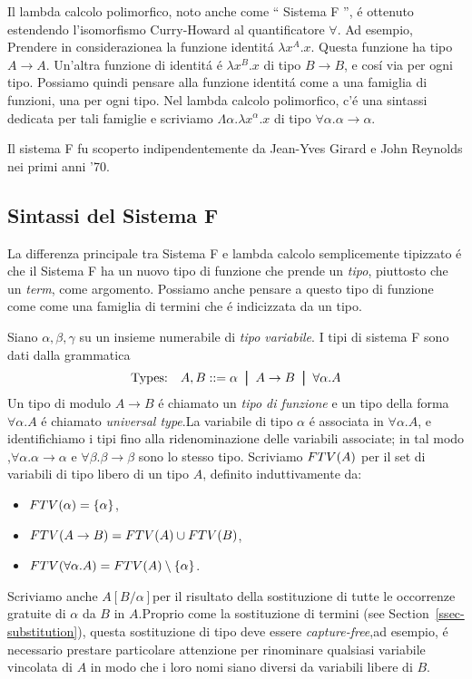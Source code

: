 \documentclass{article}
\begin{document}
Il lambda calcolo polimorfico, noto anche come `` Sistema F '', \'e
ottenuto estendendo l'isomorfismo Curry-Howard al quantificatore
$\forall$. Ad esempio, Prendere in considerazionea la funzione identit\'a $\lambda
x^A.x$.  Questa funzione ha tipo $A\to A$. Un'altra funzione di identit\'a \'e
$\lambda x^B.x$ di tipo $B\to B$, e cos\'i via per ogni tipo. Possiamo
quindi pensare alla funzione identit\'a come a una famiglia di funzioni, una per
ogni tipo. Nel lambda calcolo polimorfico, c'\'e una
sintassi dedicata per tali famiglie e scriviamo $\Lambda\alpha.\lambda
x^\alpha.x$ di tipo $\forall\alpha.\alpha\to\alpha$.

Il sistema F fu scoperto indipendentemente da Jean-Yves Girard e John
Reynolds nei primi anni '70.

\subsection{Sintassi del Sistema F}

La differenza principale tra Sistema F e lambda calcolo semplicemente
 tipizzato \'e che il Sistema F ha un nuovo tipo di funzione che prende un
 {\em tipo}, piuttosto che un {\em term}, come argomento. Possiamo anche 
pensare a questo tipo di funzione come come una famiglia di termini che \'e 
indicizzata da un tipo.

Siano $\alpha,\beta,\gamma$ su un insieme numerabile di {\em tipo
  variabile}. I tipi di sistema F sono dati dalla grammatica
\[ \mbox{Types:}\ssep A,B \bnf \alpha \bor A\to B\bor \forall\alpha.A
\]
Un tipo di modulo $A\to B$ \'e chiamato un  {\em tipo di funzione} e un 
tipo della forma $\forall\alpha.A$ \'e chiamato {\em universal type}.La 
variabile di tipo $\alpha$ \'e associata in $\forall\alpha.A$, e identifichiamo
 i tipi fino alla ridenominazione delle variabili associate; in tal modo
,$\forall\alpha.\alpha\to\alpha$ e $\forall\beta.\beta\to\beta$ sono lo stesso tipo.
 Scriviamo $FTV(A)$ per il set di variabili di tipo libero di un tipo $A$, definito induttivamente da:
\begin{itemize}
\item $FTV(\alpha) = \{\alpha\}$,
\item $FTV(A\to B) = FTV(A)\cup FTV(B)$,
\item $FTV(\forall\alpha.A) = FTV(A)\setminus\{\alpha\}$.
\end{itemize}
Scriviamo anche $A[B/\alpha]$per il risultato della sostituzione di tutte le
occorrenze gratuite di $\alpha$ da $B$ in $A$.Proprio come la sostituzione di
termini (see Section~\ref{ssec-substitution}), questa sostituzione di tipo
deve essere {\em capture-free},ad esempio, \'e necessario prestare particolare attenzione per rinominare
qualsiasi variabile vincolata di $A$ in modo che i loro nomi siano diversi da
variabili libere di  $B$.
\end{document}
